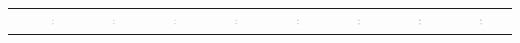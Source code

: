 \begin{table}
\begin{tabular}{|c|c|c|c|c|c|c|c|c|}
& \includegraphics[width=0.08\textwidth]{pics/gates_symbol/buffer} & \includegraphics[width=0.08\textwidth]{pics/gates_symbol/not} & \includegraphics[width=0.08\textwidth]{pics/gates_symbol/and} & \includegraphics[width=0.08\textwidth]{pics/gates_symbol/nand} & \includegraphics[width=0.08\textwidth]{pics/gates_symbol/or} & \includegraphics[width=0.08\textwidth]{pics/gates_symbol/nor} & \includegraphics[width=0.08\textwidth]{pics/gates_symbol/exor} & \includegraphics[width=0.08\textwidth]{pics/gates_symbol/xnor} \\

\end{tabular}
\end{table}
